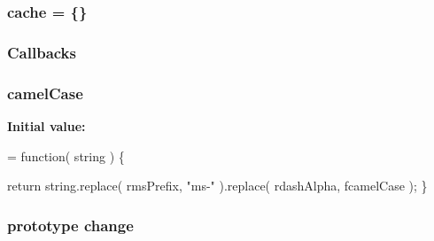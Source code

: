 \hypertarget{jquery-1_810_82-vsdoc_8js_acdb445beb9aa4c6dbdf28258e18dbb58}{
\subsubsection[{cache}]{ cache = \{\}}}\label{jquery-1_810_82-vsdoc_8js_acdb445beb9aa4c6dbdf28258e18dbb58}
\hypertarget{jquery-1_810_82-vsdoc_8js_add8d59d25831bb9b171fdbee8a18795b}{
\subsubsection[{Callbacks}]{ Callbacks}}\label{jquery-1_810_82-vsdoc_8js_add8d59d25831bb9b171fdbee8a18795b}
\hypertarget{jquery-1_810_82-vsdoc_8js_a4925571918a5ff725c5e5fb8a6ab19a4}{
\subsubsection[{camel\-Case}]{ camel\-Case}}\label{jquery-1_810_82-vsdoc_8js_a4925571918a5ff725c5e5fb8a6ab19a4}
{\bfseries Initial value\-:}
\begin{DoxyCode}
= \textcolor{keyword}{function}( string ) \{

        \textcolor{keywordflow}{return} \textcolor{keywordtype}{string}.replace( rmsPrefix, \textcolor{stringliteral}{"ms-"} ).replace( rdashAlpha, fcamelCase );
    \}
\end{DoxyCode}
\hypertarget{jquery-1_810_82-vsdoc_8js_a457ba1597967ed9e42e50a10a750290b}{
\subsubsection[{change}]{ {\bf prototype} change}}\label{jquery-1_810_82-vsdoc_8js_a457ba1597967ed9e42e50a10a750290b}
